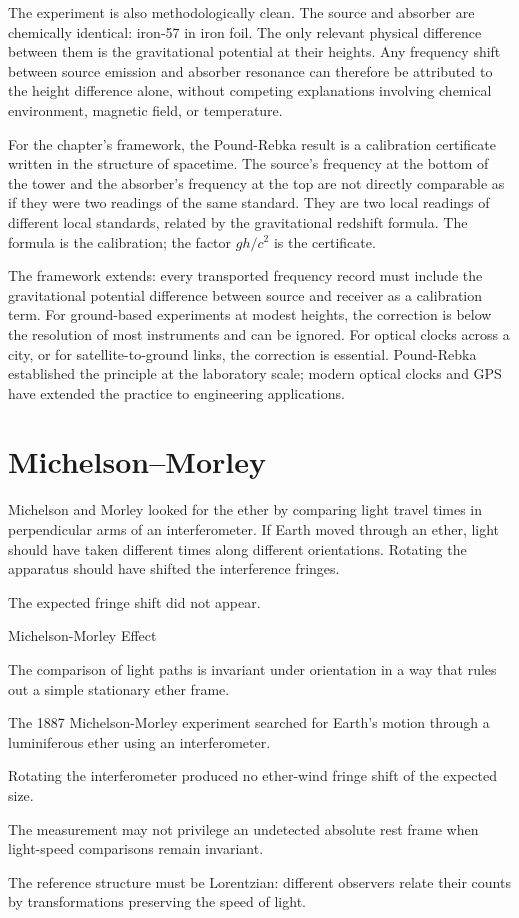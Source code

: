 The experiment is also methodologically clean. The source and absorber are
chemically identical: iron-57 in iron foil. The only relevant physical
difference between them is the gravitational potential at their heights.
Any frequency shift between source emission and absorber resonance can
therefore be attributed to the height difference alone, without competing
explanations involving chemical environment, magnetic field, or
temperature.

For the chapter's framework, the Pound-Rebka result is a calibration
certificate written in the structure of spacetime. The source's frequency
at the bottom of the tower and the absorber's frequency at the top are
not directly comparable as if they were two readings of the same standard.
They are two local readings of different local standards, related by the
gravitational redshift formula. The formula is the calibration; the
factor $gh/c^2$ is the certificate.

The framework extends: every transported frequency record must include
the gravitational potential difference between source and receiver as a
calibration term. For ground-based experiments at modest heights, the
correction is below the resolution of most instruments and can be
ignored. For optical clocks across a city, or for satellite-to-ground
links, the correction is essential. Pound-Rebka established the principle
at the laboratory scale; modern optical clocks and GPS have extended the
practice to engineering applications.

\section{Michelson--Morley}
\label{se:michelson-morley}

Michelson and Morley looked for the ether by comparing light travel times in
perpendicular arms of an interferometer. If Earth moved through an ether, light
should have taken different times along different orientations. Rotating the
apparatus should have shifted the interference fringes.

The expected fringe shift did not appear.

\begin{phenom}{Michelson-Morley Effect}
\label{ph:michelson-morley-effect}

\PhStatement The comparison of light paths is invariant under orientation in a
way that rules out a simple stationary ether frame.

\PhOrigin The 1887 Michelson-Morley experiment searched for Earth's motion
through a luminiferous ether using an interferometer.

\PhObservation Rotating the interferometer produced no ether-wind fringe shift
of the expected size.

\PhConstraint The measurement may not privilege an undetected absolute rest
frame when light-speed comparisons remain invariant.

\PhConsequence The reference structure must be Lorentzian: different observers
relate their counts by transformations preserving the speed of light.

\end{phenom}

